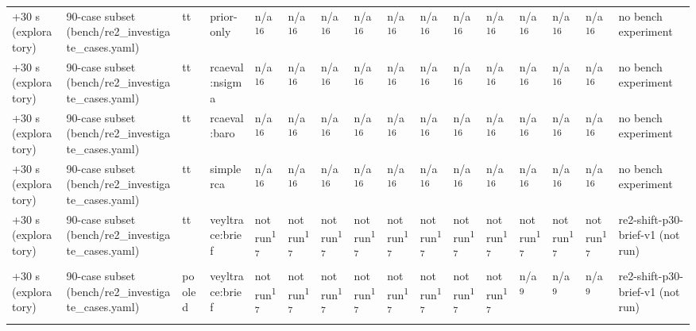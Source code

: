 \begin{table}[t]
\begin{tabular}{llllllllllllllll}
+30 s (exploratory) & 90-case subset (bench/re2\_investigate\_cases.yaml) & tt & prior-only & n/a\textsuperscript{16} & n/a\textsuperscript{16} & n/a\textsuperscript{16} & n/a\textsuperscript{16} & n/a\textsuperscript{16} & n/a\textsuperscript{16} & n/a\textsuperscript{16} & n/a\textsuperscript{16} & n/a\textsuperscript{16} & n/a\textsuperscript{16} & n/a\textsuperscript{16} & no bench experiment \\
+30 s (exploratory) & 90-case subset (bench/re2\_investigate\_cases.yaml) & tt & rcaeval:nsigma & n/a\textsuperscript{16} & n/a\textsuperscript{16} & n/a\textsuperscript{16} & n/a\textsuperscript{16} & n/a\textsuperscript{16} & n/a\textsuperscript{16} & n/a\textsuperscript{16} & n/a\textsuperscript{16} & n/a\textsuperscript{16} & n/a\textsuperscript{16} & n/a\textsuperscript{16} & no bench experiment \\
+30 s (exploratory) & 90-case subset (bench/re2\_investigate\_cases.yaml) & tt & rcaeval:baro & n/a\textsuperscript{16} & n/a\textsuperscript{16} & n/a\textsuperscript{16} & n/a\textsuperscript{16} & n/a\textsuperscript{16} & n/a\textsuperscript{16} & n/a\textsuperscript{16} & n/a\textsuperscript{16} & n/a\textsuperscript{16} & n/a\textsuperscript{16} & n/a\textsuperscript{16} & no bench experiment \\
+30 s (exploratory) & 90-case subset (bench/re2\_investigate\_cases.yaml) & tt & simplerca & n/a\textsuperscript{16} & n/a\textsuperscript{16} & n/a\textsuperscript{16} & n/a\textsuperscript{16} & n/a\textsuperscript{16} & n/a\textsuperscript{16} & n/a\textsuperscript{16} & n/a\textsuperscript{16} & n/a\textsuperscript{16} & n/a\textsuperscript{16} & n/a\textsuperscript{16} & no bench experiment \\
+30 s (exploratory) & 90-case subset (bench/re2\_investigate\_cases.yaml) & tt & veyltrace:brief & not run\textsuperscript{17} & not run\textsuperscript{17} & not run\textsuperscript{17} & not run\textsuperscript{17} & not run\textsuperscript{17} & not run\textsuperscript{17} & not run\textsuperscript{17} & not run\textsuperscript{17} & not run\textsuperscript{17} & not run\textsuperscript{17} & not run\textsuperscript{17} & re2-shift-p30-brief-v1 (not run) \\
+30 s (exploratory) & 90-case subset (bench/re2\_investigate\_cases.yaml) & pooled & veyltrace:brief & not run\textsuperscript{17} & not run\textsuperscript{17} & not run\textsuperscript{17} & not run\textsuperscript{17} & not run\textsuperscript{17} & not run\textsuperscript{17} & not run\textsuperscript{17} & not run\textsuperscript{17} & n/a\textsuperscript{9} & n/a\textsuperscript{9} & n/a\textsuperscript{9} & re2-shift-p30-brief-v1 (not run) \\

\end{tabular}
\end{table}
